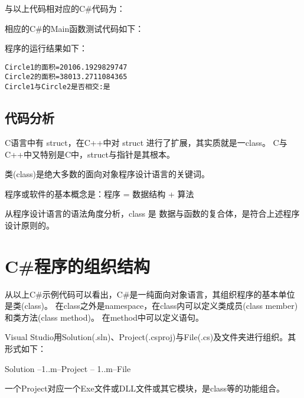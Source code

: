 与以上代码相对应的C\#代码为：


相应的C\#的Main函数测试代码如下：


程序的运行结果如下：
\begin{verbatim}
Circle1的面积=20106.1929829747
Circle2的面积=38013.2711084365
Circle1与Circle2是否相交:是
\end{verbatim}

\subsection{代码分析}
C语言中有 struct，在C++中对 struct 进行了扩展，其实质就是一class。
C与C++中又特别是C中，struct与指针是其根本。

类(class)是绝大多数的面向对象程序设计语言的关键词。

程序或软件的基本概念是：程序 = 数据结构 + 算法

从程序设计语言的语法角度分析，class 是 数据与函数的复合体，是符合上述程序设计原则的。

\section{ C\#程序的组织结构}

 从以上C\#示例代码可以看出，C\#是一纯面向对象语言，其组织程序的基本单位是类(class)。
 在class之外是namespace，在class内可以定义类成员(class member)和类方法(class method)。
 在method中可以定义语句。

 Visual Studio用Solution(.sln)、Project(.csproj)与File(.cs)及文件夹进行组织。其形式如下：

 Solution --1..m--Project -- 1..m--File

 一个Project对应一个Exe文件或DLL文件或其它模块，是class等的功能组合。